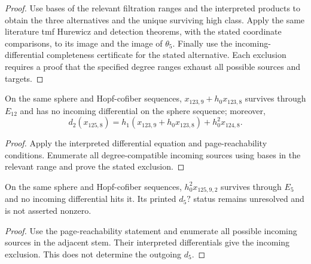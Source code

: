 \begin{proof}
  Use bases of the relevant filtration ranges and the interpreted products
  to obtain the three alternatives and the unique surviving high class. Apply the same literature
  tmf Hurewicz and detection theorems,
  with the stated coordinate comparisons, to its image and the image of
  $\theta_5$. Finally use the incoming-differential completeness certificate
  for the stated alternative. Each exclusion requires a proof that the
  specified degree ranges exhaust all possible sources and targets.
\end{proof}

\begin{proposition}
  \label{evidence:x_123_9}
  \notready
  On the same sphere and Hopf-cofiber sequences,
  $x_{123,9}+h_0x_{123,8}$ survives through $E_{12}$ and has no incoming
  differential on the sphere sequence; moreover,
  \[
    d_2(x_{125,8})=
      h_1(x_{123,9}+h_0x_{123,8})+h_0^2x_{124,8}.
  \]
\end{proposition}

\begin{proof}
  Apply the interpreted differential equation and page-reachability
  conditions. Enumerate all degree-compatible incoming sources using
  bases in the relevant range and prove the stated exclusion.
\end{proof}

\begin{proposition}[$h_0^2x_{125,9,2}$ evidence]
  \label{evidence:h_0_sq_mul_x_125_9_2}
  \notready
  On the same sphere and Hopf-cofiber sequences,
  $h_0^2x_{125,9,2}$ survives through $E_5$ and no incoming
  differential hits it.  Its printed $d_5?$ status remains unresolved and is
  not asserted nonzero.
\end{proposition}

\begin{proof}
  Use the page-reachability statement and enumerate all possible incoming
  sources in the adjacent stem. Their interpreted differentials give the
  incoming exclusion. This does not determine the outgoing $d_5$.
\end{proof}

